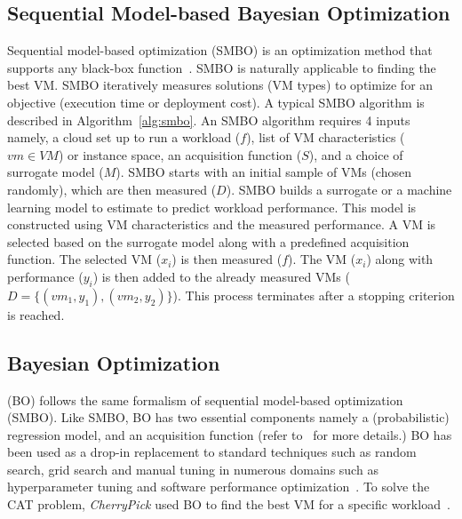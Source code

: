 \subsection{Sequential Model-based Bayesian Optimization}
\label{sec:smbo}

Sequential model-based optimization (SMBO) is an optimization method that supports any black-box function~\cite{Dewancker2015}.
SMBO is naturally applicable to finding the best VM. 
SMBO iteratively measures solutions (VM types) to optimize for an objective (execution time or deployment cost).
A typical SMBO algorithm is described in Algorithm~\ref{alg:smbo}.
An SMBO algorithm requires 4 inputs namely, a cloud set up to run a workload ($f$), list of VM characteristics ($vm\in\mathit{VM}$) or instance space, an acquisition function ($S$), and a choice of surrogate model ($M$). SMBO starts with an initial sample of VMs (chosen randomly), which are then measured ($D$).
SMBO builds a surrogate or a machine learning model to estimate to predict workload performance.
This model is constructed using VM characteristics and the measured performance.
A VM is selected based on the surrogate model along with a predefined acquisition function.
The selected VM ($x_i$) is then measured ($f$).
The VM ($x_i$) along with performance ($y_i$) is then added to the already measured VMs ($D=\{(vm_1, y_1), (vm_2, y_2)\}$).
This process terminates after a stopping criterion is reached.






\subsection{Bayesian Optimization}
\label{sec:bo}

\bo (BO) follows the same formalism of sequential model-based optimization (SMBO).
Like SMBO, BO has two essential components namely a (probabilistic) regression model, and an acquisition function (refer to~\cite{shahriari2016taking} for more details.)
BO has been used as a drop-in replacement to standard techniques such as
random search, grid search and manual tuning in numerous domains such as hyperparameter tuning and software performance optimization~\cite{Dewancker2015, golovin2017google, nair2017, zuluaga2016varepsilon}.
To solve the CAT problem,
\emph{CherryPick} used BO to find the best VM for a specific workload~\cite{Alipourfard2017}.


